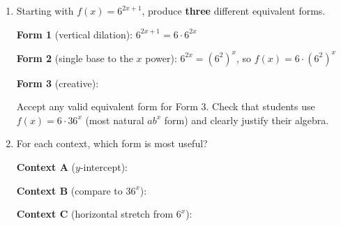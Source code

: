 \documentclass[10pt]{article}
\begin{document}
\begin{tcolorbox}[colback=white, colframe=black!40,
    title=\textbf{Tier E --- Extend},
    fonttitle=\bfseries, arc=2mm, left=3mm, right=3mm, top=2mm, bottom=2mm]

\begin{enumerate}[itemsep=10pt]

  \item Starting with $f(x) = 6^{2x+1}$, produce \textbf{three} different equivalent forms.

        \textbf{Form 1} (vertical dilation): $6^{2x+1} = 6 \cdot 6^{2x}$ 

        \textbf{Form 2} (single base to the $x$ power): $6^{2x} = (6^2)^x$, so $f(x) = 6 \cdot (6^2)^x$ 

        \textbf{Form 3} (creative): 

        \begin{teachernote}
          Accept any valid equivalent form for Form 3. Check that students use $f(x) = 6 \cdot 36^x$
          (most natural $ab^x$ form) and clearly justify their algebra.
        \end{teachernote}

  \item For each context, which form is most useful?

        \textbf{Context A} ($y$-intercept): 

        \textbf{Context B} (compare to $36^x$): 

        \textbf{Context C} (horizontal stretch from $6^x$): 

\end{enumerate}
\end{tcolorbox}
\end{document}
